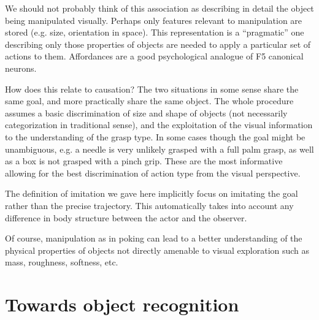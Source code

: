 We should not probably think of this association as describing in
detail the object being manipulated visually. Perhaps only features
relevant to manipulation are stored (e.g. size, orientation in space).
This representation is a ``pragmatic'' one describing only those
properties of objects are needed to apply a particular set of actions
to them. Affordances are a good psychological analogue of F5
canonical neurons.
\fi


\ifverbose
How does this relate to causation?  The two situations in some sense
share the same goal, and more practically share the same object.  The
whole procedure assumes a basic discrimination of size and shape of
objects (not necessarily categorization in traditional sense), and the
exploitation of the visual information to the understanding of the
grasp type. In some cases though the goal might be unambiguous, e.g. a
needle is very unlikely grasped with a full palm grasp, as well as a
box is not grasped with a pinch grip. These are the most informative
allowing for the best discrimination of action type from the visual
perspective.
\fi

\ifverbose
The definition of imitation we gave here implicitly focus on imitating
the goal rather than the precise trajectory. This automatically takes
into account any difference in body structure between the actor and
the observer.

Of course, manipulation as in poking can lead to a better
understanding of the physical properties of objects not directly
amenable to visual exploration such as mass, roughness, softness, etc.
\fi


\section{Towards object recognition}

